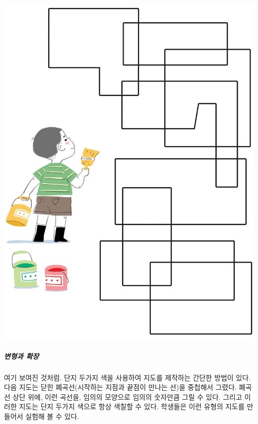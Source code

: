 \documentclass[]{article}
\begin{document}
\includegraphics{csunplugged/04-part/img/ch14-coloring/13-coloring-06-coloring-countries.png}

\subparagraph{변형과 확장}\label{section-194}

여기 보여진 것처럼. 단지 두가지 색을 사용하여 지도를 제작하는 간단한
방법이 있다. 다음 지도는 닫힌 폐곡선(시작하는 지점과 끝점이 만나는 선)을
중첩해서 그렸다. 폐곡선 상단 위에, 이런 곡선을, 임의의 모양으로 임의의
숫자만큼 그릴 수 있다. 그리고 이러한 지도는 단지 두가지 색으로 항상
색칠할 수 있다. 학생들은 이런 유형의 지도를 만들어서 실험해 볼 수 있다.
\end{document}
